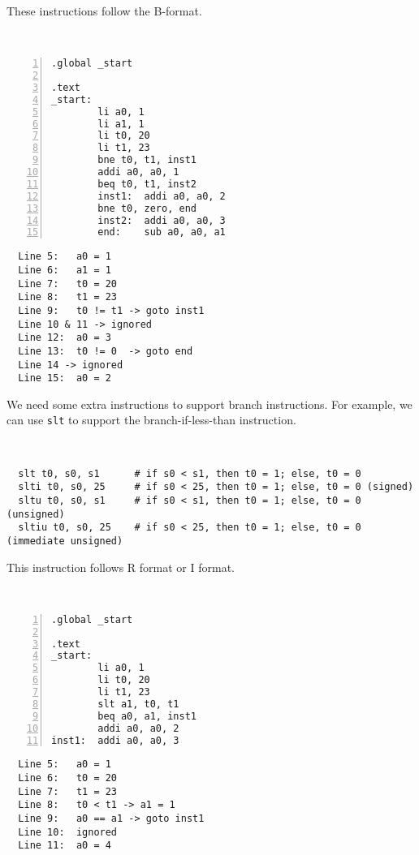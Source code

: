 These instructions follow the B-format.

\begin{eg}~

\begin{minipage}{0.5\textwidth}
\begin{Verbatim}[numbers=left,xleftmargin=5mm]
.global _start

.text
_start:
        li a0, 1
        li a1, 1
        li t0, 20
        li t1, 23
        bne t0, t1, inst1
        addi a0, a0, 1
        beq t0, t1, inst2
        inst1:  addi a0, a0, 2
        bne t0, zero, end
        inst2:  addi a0, a0, 3
        end:    sub a0, a0, a1
\end{Verbatim}
\end{minipage}
\begin{minipage}{0.5\textwidth}
\color{red}
\begin{verbatim}
  Line 5:   a0 = 1
  Line 6:   a1 = 1
  Line 7:   t0 = 20
  Line 8:   t1 = 23
  Line 9:   t0 != t1 -> goto inst1
  Line 10 & 11 -> ignored
  Line 12:  a0 = 3
  Line 13:  t0 != 0  -> goto end 
  Line 14 -> ignored
  Line 15:  a0 = 2
\end{verbatim}
\end{minipage}
\end{eg}

We need some extra instructions to support branch instructions. For example, we can use \verb|slt| to support the branch-if-less-than instruction.
\begin{codeBlock}~
\begin{verbatim}
  slt t0, s0, s1      # if s0 < s1, then t0 = 1; else, t0 = 0
  slti t0, s0, 25     # if s0 < 25, then t0 = 1; else, t0 = 0 (signed)
  sltu t0, s0, s1     # if s0 < s1, then t0 = 1; else, t0 = 0 (unsigned)
  sltiu t0, s0, 25    # if s0 < 25, then t0 = 1; else, t0 = 0 (immediate unsigned)
\end{verbatim}
\end{codeBlock}

This instruction follows R format or I format. 

\begin{eg}~

\begin{minipage}{0.5\textwidth}
\begin{Verbatim}[numbers=left,xleftmargin=5mm]
.global _start

.text
_start:
        li a0, 1
        li t0, 20
        li t1, 23
        slt a1, t0, t1
        beq a0, a1, inst1
        addi a0, a0, 2
inst1:  addi a0, a0, 3
\end{Verbatim}
\end{minipage}
\begin{minipage}{0.5\textwidth}
\color{red}
\begin{verbatim}
  Line 5:   a0 = 1
  Line 6:   t0 = 20
  Line 7:   t1 = 23
  Line 8:   t0 < t1 -> a1 = 1
  Line 9:   a0 == a1 -> goto inst1
  Line 10:  ignored
  Line 11:  a0 = 4
\end{verbatim}
\end{minipage}
\end{eg}

